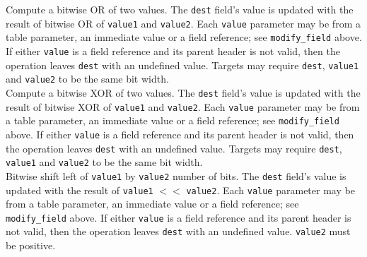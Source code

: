 \documentclass[12pt]{article}
\begin{document}

{ %
Compute a bitwise OR of two values.
}
{ %
}
{ %
The \texttt{dest} field's value is updated with the result of bitwise OR of
\texttt{value1} and \texttt{value2}. Each \texttt{value} parameter may be from a
table parameter, an immediate value or a field reference; see \texttt{modify_field} above. If either \texttt{value}
is a field reference and its parent header is not valid, then the operation
leaves \texttt{dest} with an undefined value.
Targets may require \texttt{dest}, \texttt{value1} and \texttt{value2} to
be the same bit width.
}\\


{ %
Compute a bitwise XOR of two values.
}
{ %
}
{ %
The \texttt{dest} field's value is updated with the result of bitwise XOR of
\texttt{value1} and \texttt{value2}. Each \texttt{value} parameter may be from a
table parameter, an immediate value or a field reference; see \texttt{modify_field} above. If either \texttt{value}
is a field reference and its parent header is not valid, then the operation
leaves \texttt{dest} with an undefined value.
Targets may require \texttt{dest}, \texttt{value1} and \texttt{value2} to
be the same bit width.
}\\


{ %
Bitwise shift left of \texttt{value1} by \texttt{value2} number of bits.
}
{ %
}
{ %
The \texttt{dest} field's value is updated with the result of 
\texttt{value1} $<<$ \texttt{value2}. Each \texttt{value} parameter may be from a
table parameter, an immediate value or a field reference; see \texttt{modify_field} above. If either \texttt{value}
is a field reference and its parent header is not valid, then the operation
leaves \texttt{dest} with an undefined value. \texttt{value2} must be positive.
}\\
\end{document}
